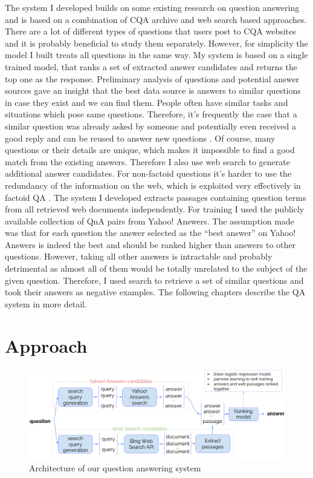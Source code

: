\documentclass[]{article}
\begin{document}
The system I developed builds on some existing research on question answering and is based on a combination of CQA archive and web search based approaches.
There are a lot of different types of questions that users post to CQA websites and it is probably beneficial to study them separately.
However, for simplicity the model I built treats all questions in the same way.
My system is based on a single trained model, that ranks a set of extracted answer candidates and returns the top one as the response.
Preliminary analysis of questions and potential answer sources gave an insight that the best data source is answers to similar questions in case they exist and we can find them.
People often have similar tasks and situations which pose same questions.
Therefore, it's frequently the case that a similar question was already asked by someone and potentially even received a good reply and can be reused to answer new questions \cite{Shtok:2012:LPA:2187836.2187939}.
Of course, many questions or their details are unique, which makes it impossible to find a good match from the existing answers.
Therefore I also use web search to generate additional answer candidates.
For non-factoid questions it's harder to use the redundancy of the information on the web, which is exploited very effectively in factoid QA \cite{Lin:2007:EPU:1229179.1229180}.
The system I developed extracts passages containing question terms from all retrieved web documents independently.
For training I used the publicly available collection of QnA pairs from Yahoo! Answers.
The assumption made was that for each question the answer selected as the ``best answer'' on Yahoo! Answers is indeed the best and should be ranked higher than answers to other questions.
However, taking all other answers is intractable and probably detrimental as almost all of them would be totally unrelated to the subject of the given question.
Therefore, I used search to retrieve a set of similar questions and took their answers as negative examples.
The following chapters describe the QA system in more detail.

\section{Approach}

\begin{figure}
	\includegraphics[width=460px]{img/qa_model}
	\caption{Architecture of our question answering system}
	\label{figure:qa_model}
\end{figure}
\end{document}

